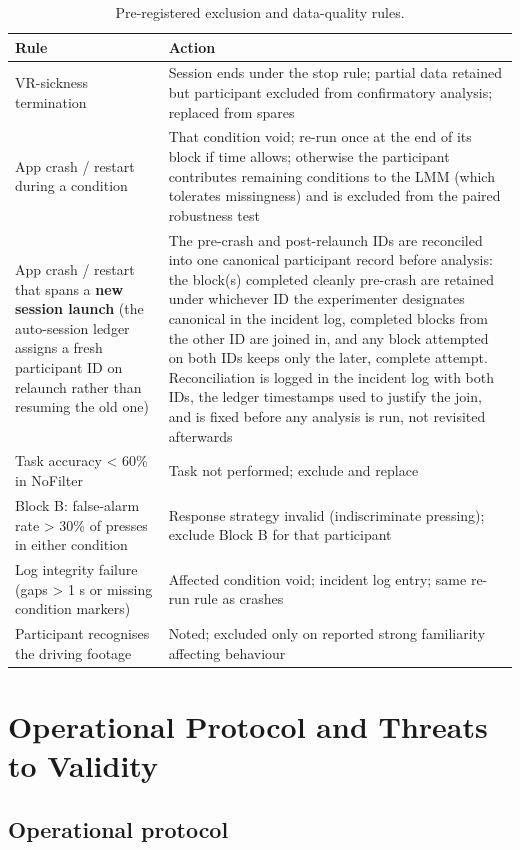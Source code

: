\begin{longtable}{p{}|p{}}
\caption{Pre-registered exclusion and data-quality rules.}\\
\hline
\textbf{Rule} & \textbf{Action} \\
\hline
\endhead
\hline
VR-sickness termination & Session ends under the stop rule; partial data retained but participant excluded from confirmatory analysis; replaced from spares \\
App crash / restart during a condition & That condition void; re-run once at the end of its block if time allows; otherwise the participant contributes remaining conditions to the LMM (which tolerates missingness) and is excluded from the paired robustness test \\
App crash / restart that spans a \textbf{new session launch} (the auto-session ledger assigns a fresh participant ID on relaunch rather than resuming the old one) & The pre-crash and post-relaunch IDs are reconciled into one canonical participant record before analysis: the block(s) completed cleanly pre-crash are retained under whichever ID the experimenter designates canonical in the incident log, completed blocks from the other ID are joined in, and any block attempted on both IDs keeps only the later, complete attempt. Reconciliation is logged in the incident log with both IDs, the ledger timestamps used to justify the join, and is fixed before any analysis is run, not revisited afterwards \\
Task accuracy < 60\% in NoFilter & Task not performed; exclude and replace \\
Block B: false-alarm rate > 30\% of presses in either condition & Response strategy invalid (indiscriminate pressing); exclude Block B for that participant \\
Log integrity failure (gaps > 1 s or missing condition markers) & Affected condition void; incident log entry; same re-run rule as crashes \\
Participant recognises the driving footage & Noted; excluded only on reported strong familiarity affecting behaviour \\
\hline
\end{longtable}

\section{Operational Protocol and Threats to Validity}

\subsection{Operational protocol}

